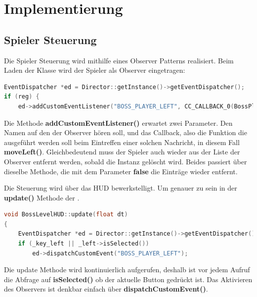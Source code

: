 \chapter{Implementierung}\label{ch:impl}

\section{Spieler Steuerung}\label{sec:4_SpielerSteuerung}

Die Spieler Steuerung wird mithilfe eines Observer Patterns realisiert. Beim Laden der  Klasse wird der Spieler als Observer eingetragen:

\begin{lstlisting}[label=lst:player_control_observer,
				   language=C++,
				   firstnumber=103,
				   caption=BossPlayer als Observer eintragen ( BossPlayer.cpp )]
EventDispatcher *ed = Director::getInstance()->getEventDispatcher();
if (reg) {
	ed->addCustomEventListener("BOSS_PLAYER_LEFT", CC_CALLBACK_0(BossPlayer::moveLeft, this));
\end{lstlisting}

Die Methode \textbf{addCustomEventListener()} erwartet zwei Parameter. Den Namen auf den der Observer hören soll, und das Callback, also die Funktion die ausgeführt werden soll beim Eintreffen einer solchen Nachricht, in diesem Fall \textbf{moveLeft()}. 
Gleichbedeutend muss der Spieler auch wieder aus der Liste der Observer entfernt werden, sobald die Instanz gelöscht wird. Beides passiert über dieselbe Methode, die mit dem Parameter \textbf{false} die Einträge wieder entfernt.

Die Steuerung wird über das HUD bewerkstelligt. Um genauer zu sein in der \textbf{update()} Methode der .

\begin{lstlisting}[label=lst:player_control_push_msg,
				   language=C++,
				   firstnumber=181,
				   caption=Drücken des Laufen-Buttons ( BossLevelHUD.cpp )]
void BossLevelHUD::update(float dt)
{
	EventDispatcher *ed = Director::getInstance()->getEventDispatcher();
	if (_key_left || _left->isSelected())
		ed->dispatchCustomEvent("BOSS_PLAYER_LEFT");
\end{lstlisting}

Die update Methode wird kontinuierlich aufgerufen, deshalb ist vor jedem Aufruf die Abfrage auf \textbf{isSelected()} ob der aktuelle Button gedrückt ist. Das Aktivieren des Observers ist denkbar einfach über \textbf{dispatchCustomEvent()}.

